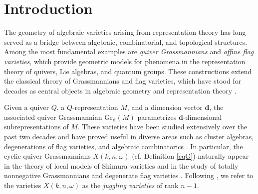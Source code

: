 \documentclass[10pt, a4paper, reqno]{amsart}
\begin{document}
	
	
	
	
	\begin{abstract}
		We determine the ring structure of the torus-equivariant cohomology of rank-one juggling varieties with rational coefficients. By realizing these varieties as cyclic quiver Grassmannians, we construct a Knutson--Tao type basis for their equivariant cohomology. Using this basis, we give an explicit description of the ring structure in terms of generators and relations, and compute the corresponding structure constants. Finally, we show that these structure constants are integral.
	\end{abstract}

	\maketitle

	
	\section{Introduction}
The geometry of algebraic varieties arising from representation theory has long served as a bridge between algebraic, combinatorial, and topological structures. Among the most fundamental examples are \emph{quiver Grassmannians} and \emph{affine flag varieties}, which provide geometric models for phenomena in the representation theory of quivers, Lie algebras, and quantum groups. These constructions extend the classical theory of Grassmannians and flag varieties, which have stood for decades as central objects in algebraic geometry and representation theory \cite{carter, k}.


Given a quiver $Q$, a $Q$-representation $M$, and a dimension vector $\mathbf{d}$, the associated quiver Grassmannian $\mbox{Gr}_{\mathbf{d}}(M)$ parametrizes $\mathbf{d}$-dimensional subrepresentations of $M$. These varieties have been studied extensively over the past two decades and have proved useful in diverse areas such as cluster algebras, degenerations of flag varieties, and algebraic combinatorics \cite{cer11, ifr12, ifr13, cer16, cfffr17, sc14}. In particular, the cyclic quiver Grassmannians $X(k,n,\omega)$ (cf. Definition \ref{cqG}) naturally appear in the theory of local models of Shimura varieties \cite{PappasRapoport2005, prs,HainesNgo2002, Gortz2001} and in the study of totally nonnegative Grassmannians and degenerate flag varieties \cite{Feigin, flp24, flp25, p22}. Following \cite{Knutson}, we refer to the varieties $X(k,n,\omega)$ as the \emph{juggling varieties} of rank $n-1$.
\end{document}
